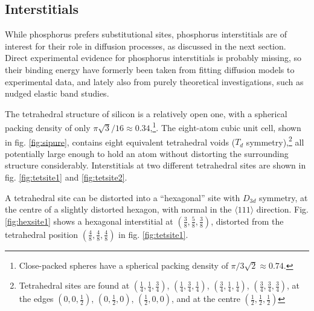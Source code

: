 \documentclass[11pt,bibliography=totoc,index=totoc]{scrbook}   %
\begin{document}


%
\subsection{Interstitials}\label{sec:PInterstitials}
%

While phosphorus prefers substitutional sites,
phosphorus interstitials are of interest for their role in diffusion processes, as discussed in the next section.
Direct experimental evidence for phosphorus interstitials is probably missing, 
so their binding energy have formerly been taken from fitting diffusion models to experimental data, 
and lately also from purely theoretical investigations,\cite[391]{Pichler:2004} such as nudged elastic band studies.

The tetrahedral structure of silicon is a relatively open one, with a spherical packing density of only $\pi\sqrt{3}/16\approx 0.34$,\footnote{Close-packed spheres have a spherical packing density of $\pi/3\sqrt{2} \approx 0.74$.}.
The eight-atom cubic unit cell, shown in fig. \ref{fig:sipure}, contains eight equivalent tetrahedral voids ($T_d$ symmetry),\footnote{Tetrahedral sites are found at
$(\frac{1}{4},\frac{1}{4},\frac{3}{4})$, 
$(\frac{1}{4},\frac{3}{4},\frac{1}{4})$, 
$(\frac{3}{4},\frac{1}{4},\frac{1}{4})$, 
$(\frac{3}{4},\frac{3}{4},\frac{3}{4})$, 
at the edges
$(0,0,\frac{1}{2})$,
$(0,\frac{1}{2},0)$,
$(\frac{1}{2},0,0)$,
and at the centre
$(\frac{1}{2},\frac{1}{2},\frac{1}{2})$}
all potentially large enough to hold an atom without distorting the surrounding structure considerably.
Interstitials at two different tetrahedral sites are shown in fig. \ref{fig:tetsite1} and \ref{fig:tetsite2}.

A tetrahedral site can be distorted into a ``hexagonal'' site with $D_{3d}$ symmetry, 
at the centre of a slightly distorted hexagon, with normal in the $\langle 111 \rangle$ direction. 
Fig. \ref{fig:hexsite1} shows a hexagonal interstitial at $(\frac{3}{8},\frac{5}{8},\frac{3}{8})$, 
distorted from the tetrahedral position $(\frac{4}{8},\frac{4}{8},\frac{4}{8})$ in fig. \ref{fig:tetsite1}.

\end{document}
